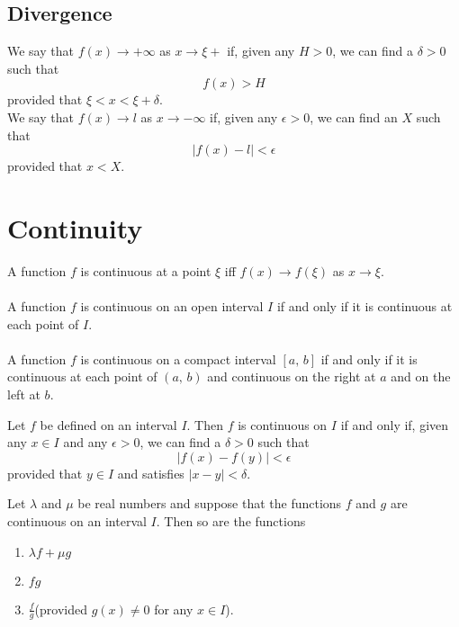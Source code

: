\documentclass[10pt, a4paper]{article}
\begin{document}
\subsection{Divergence}
We say that $f(x) \rightarrow +\infty$ as $x \rightarrow \xi+$ if, given any $H > 0$, we can find a $\delta > 0$ such that
$$f(x) > H$$
provided that $\xi < x < \xi + \delta$. \\
We say that $f(x) \rightarrow l$ as $x \rightarrow -\infty$ if, given any $\epsilon > 0$, we can find an $X$ such that
$$|f(x) - l| < \epsilon$$
provided that $x < X$.

\newpage

\section{Continuity}
A function $f$ is continuous at a point $\xi$ iff $f(x) \rightarrow f(\xi)$ as $x \rightarrow \xi$. \\
\\
A function $f$ is continuous on an open interval $I$ if and only if it is continuous at each point of $I$. \\
\\
A function $f$ is continuous on a compact interval $[a,\,b]$ if and only if it is continuous at each point of $(a,\,b)$ and continuous on the right at $a$ and on the left at $b$. \\

\begin{proposition}
    Let $f$ be defined on an interval $I$. Then $f$ is continuous on $I$ if and only if, given any $x \in I$ and any $\epsilon > 0$, we can find a $\delta > 0$ such that
    $$|f(x) - f(y)| < \epsilon$$
    provided that $y \in I$ and satisfies $|x - y| < \delta$.
\end{proposition}

\begin{proposition}
    Let $\lambda$ and $\mu$ be real numbers and suppose that the functions $f$ and $g$ are continuous on an interval $I$. Then so are the functions
    \begin{enumerate}[label = (\roman*)]
        \item $\lambda f + \mu g$
        \item $fg$
        \item $\frac{f}{g}$\qquad(provided $g(x) \neq 0$ for any $x \in I$).
    \end{enumerate}
\end{proposition}
\end{document}
